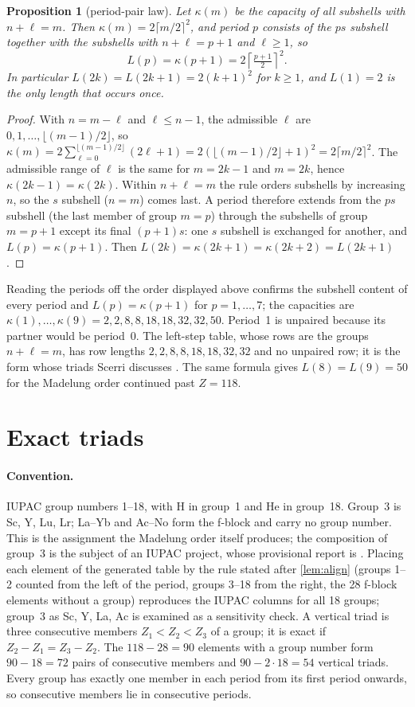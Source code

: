 \documentclass[11pt]{article}
\newtheorem{proposition}[theorem]{Proposition}
\theoremstyle{definition}\newtheorem{definition}[theorem]{Definition}
\theoremstyle{remark}\newtheorem{remark}[theorem]{Remark}
\begin{document}
\begin{proposition}[period-pair law]\label{prop:pair}
Let $\kappa(m)$ be the capacity of all subshells with $n+\ell=m$. Then $\kappa(m)=2\lceil m/2\rceil^2$, and period $p$ consists of the $ps$ subshell together with the subshells with $n+\ell=p+1$ and $\ell\ge1$, so
\[
L(p)=\kappa(p+1)=2\left\lceil\tfrac{p+1}{2}\right\rceil^2 .
\]
In particular $L(2k)=L(2k+1)=2(k+1)^2$ for $k\ge1$, and $L(1)=2$ is the only length that occurs once.
\end{proposition}
\begin{proof}
With $n=m-\ell$ and $\ell\le n-1$, the admissible $\ell$ are $0,1,\dots,\lfloor (m-1)/2\rfloor$, so $\kappa(m)=2\sum_{\ell=0}^{\lfloor (m-1)/2\rfloor}(2\ell+1)=2(\lfloor (m-1)/2\rfloor+1)^2=2\lceil m/2\rceil^2$. The admissible range of $\ell$ is the same for $m=2k-1$ and $m=2k$, hence $\kappa(2k-1)=\kappa(2k)$. Within $n+\ell=m$ the rule orders subshells by increasing $n$, so the $s$ subshell ($n=m$) comes last. A period therefore extends from the $ps$ subshell (the last member of group $m=p$) through the subshells of group $m=p+1$ except its final $(p+1)s$: one $s$ subshell is exchanged for another, and $L(p)=\kappa(p+1)$. Then $L(2k)=\kappa(2k+1)=\kappa(2k+2)=L(2k+1)$.
\end{proof}

Reading the periods off the order displayed above confirms the subshell content of every period and $L(p)=\kappa(p+1)$ for $p=1,\dots,7$; the capacities are $\kappa(1),\dots,\kappa(9)=2,2,8,8,18,18,32,32,50$. Period~1 is unpaired because its partner would be period~0. The left-step table, whose rows are the groups $n+\ell=m$, has row lengths $2,2,8,8,18,18,32,32$ and no unpaired row; it is the form whose triads Scerri discusses \cite{Scerri2010,Scerri2022}. The same formula gives $L(8)=L(9)=50$ for the Madelung order continued past $Z=118$.

\section{Exact triads}\label{sec:triads}
\paragraph{Convention.} IUPAC group numbers 1--18, with H in group~1 and He in group~18. Group~3 is Sc, Y, Lu, Lr; La--Yb and Ac--No form the f-block and carry no group number. This is the assignment the Madelung order itself produces; the composition of group~3 is the subject of an IUPAC project, whose provisional report is \cite{ScerriG3}. Placing each element of the generated table by the rule stated after \cref{lem:align} (groups 1--2 counted from the left of the period, groups 3--18 from the right, the 28 f-block elements without a group) reproduces the IUPAC columns for all 18 groups; group~3 as Sc, Y, La, Ac is examined as a sensitivity check. A vertical triad is three consecutive members $Z_1<Z_2<Z_3$ of a group; it is exact if $Z_2-Z_1=Z_3-Z_2$. The $118-28=90$ elements with a group number form $90-18=72$ pairs of consecutive members and $90-2\cdot18=54$ vertical triads. Every group has exactly one member in each period from its first period onwards, so consecutive members lie in consecutive periods.
\end{document}
